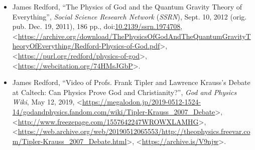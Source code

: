 \documentclass[letterpaper,11pt]{article}
\newcommand{\dsc}{\discretionary{}{}{}}
\begin{document}
\begin{itemize}
\small
\item James Redford, ``The Physics of God and the Quantum Gravity Theory of Everything'', \emph{Social Science Research Network} (\emph{SSRN}), Sept. 10, 2012 (orig. pub. Dec. 19, 2011), 186 pp., doi:\discretionary{}{}{}\href{https://dx.doi.org/10.2139/ssrn.1974708}{10\dsc .2139/\dsc ssrn\dsc .1974708}, \textless\href{https://archive.org/download/ThePhysicsOfGodAndTheQuantumGravityTheoryOfEverything/Redford-Physics-of-God.pdf}{\textsf{https\dsc :\dsc //\dsc archive\dsc .org/\dsc download/\dsc The\dsc Physics\dsc Of\dsc God\dsc And\dsc The\dsc Quantum\dsc Gravity\dsc Theory\dsc Of\dsc Everything/\dsc Redford\dsc -Physics\dsc -of\dsc -God\dsc .pdf}}\textgreater , \textless\href{https://purl.org/redford/physics-of-god}{\textsf{https\dsc :\dsc //\dsc purl\dsc .org/\dsc redford/\dsc physics\dsc -of\dsc -god}}\textgreater , \textless\href{https://webcitation.org/74HMsJGbP}{\textsf{https\dsc :\dsc //\dsc webcitation\dsc .org/\dsc 74HMsJGbP}}\textgreater .

\item James Redford, ``Video of Profs. Frank Tipler and Lawrence Krauss's Debate at Caltech: Can Physics Prove God and Christianity?'', \emph{God and Physics Wiki}, May 12, 2019, \textless\href{https://megalodon.jp/2019-0512-1524-14/godandphysics.fandom.com/wiki/Tipler-Krauss_2007_Debate}{\textsf{https\dsc :\dsc //\dsc mega\dsc lodon\dsc .jp/\dsc 2019\dsc -0512\dsc -1524\dsc -14/\dsc god\dsc and\dsc physics\dsc .fandom\dsc .com/\dsc wiki/\dsc Tipler\dsc -Krauss\dsc \_2007\dsc \_Debate}}\textgreater , \textless\href{http://www.freezepage.com/1557642247WROWXLAMHG}{\textsf{http\dsc :\dsc //\dsc www\dsc .freeze\dsc page\dsc .com/\dsc 1557642247\dsc WROWXLAMHG}}\textgreater , \textless\href{https://web.archive.org/web/20190512065553/http://theophysics.freevar.com/Tipler-Krauss_2007_Debate.html}{\textsf{https\dsc :\dsc //\dsc web\dsc .archive\dsc .org/\dsc web/\dsc 20190512\dsc 065553/\dsc http\dsc :\dsc //\dsc theo\dsc physics\dsc .freevar\dsc .com/\dsc Tipler\dsc -Krauss\dsc \_2007\dsc \_Debate\dsc .html}}\textgreater , \textless\href{https://archive.is/V9njw}{\textsf{https\dsc :\dsc //\dsc archive\dsc .is/\dsc V9njw}}\textgreater .


\end{itemize}
\end{document}
